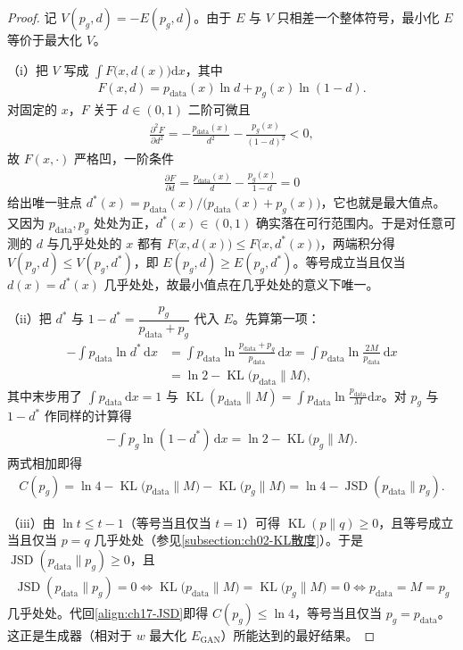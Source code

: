 \documentclass[../../main.tex]{subfiles}
\begin{document}
\begin{proof}
记 $V(p_g,d)=-E(p_g,d)$。由于 $E$ 与 $V$ 只相差一个整体符号，最小化 $E$ 等价于最大化 $V$。

（i）把 $V$ 写成 $\int F\big(x,d(x)\big)\mathrm{d}x$，其中
\begin{align*}
F(x,d)=p_{\mathrm{data}}(x)\ln d+p_g(x)\ln(1-d).
\end{align*}
对固定的 $x$，$F$ 关于 $d\in(0,1)$ 二阶可微且
\begin{align*}
\frac{\partial^2F}{\partial d^2}=-\frac{p_{\mathrm{data}}(x)}{d^2}-\frac{p_g(x)}{(1-d)^2}<0,
\end{align*}
故 $F(x,\cdot)$ 严格凹，一阶条件
\begin{align*}
\frac{\partial F}{\partial d}=\frac{p_{\mathrm{data}}(x)}{d}-\frac{p_g(x)}{1-d}=0
\end{align*}
给出唯一驻点 $d^*(x)=p_{\mathrm{data}}(x)/\big(p_{\mathrm{data}}(x)+p_g(x)\big)$，它也就是最大值点。又因为 $p_{\mathrm{data}},p_g$ 处处为正，$d^*(x)\in(0,1)$ 确实落在可行范围内。于是对任意可测的 $d$ 与几乎处处的 $x$ 都有 $F\big(x,d(x)\big)\leqslant F\big(x,d^*(x)\big)$，两端积分得 $V(p_g,d)\leqslant V(p_g,d^*)$，即 $E(p_g,d)\geqslant E(p_g,d^*)$。等号成立当且仅当 $d(x)=d^*(x)$ 几乎处处，故最小值点在几乎处处的意义下唯一。

（ii）把 $d^*$ 与 $1-d^*=\dfrac{p_g}{p_{\mathrm{data}}+p_g}$ 代入 $E$。先算第一项：
\begin{align*}
-\int p_{\mathrm{data}}\ln d^*\,\mathrm{d}x
&=\int p_{\mathrm{data}}\ln\frac{p_{\mathrm{data}}+p_g}{p_{\mathrm{data}}}\,\mathrm{d}x
=\int p_{\mathrm{data}}\ln\frac{2M}{p_{\mathrm{data}}}\,\mathrm{d}x\\
&=\ln 2-\operatorname{KL}\big(p_{\mathrm{data}}\|M\big),
\end{align*}
其中末步用了 $\int p_{\mathrm{data}}\,\mathrm{d}x=1$ 与 $\operatorname{KL}(p_{\mathrm{data}}\|M)=\int p_{\mathrm{data}}\ln\frac{p_{\mathrm{data}}}{M}\mathrm{d}x$。对 $p_g$ 与 $1-d^*$ 作同样的计算得
\begin{align*}
-\int p_g\ln(1-d^*)\,\mathrm{d}x=\ln 2-\operatorname{KL}\big(p_g\|M\big).
\end{align*}
两式相加即得
\begin{align*}
C(p_g)=\ln 4-\operatorname{KL}\big(p_{\mathrm{data}}\|M\big)-\operatorname{KL}\big(p_g\|M\big)=\ln 4-\operatorname{JSD}(p_{\mathrm{data}}\|p_g).
\end{align*}

（iii）由 $\ln t\leqslant t-1$（等号当且仅当 $t=1$）可得 $\operatorname{KL}(p\|q)\geqslant0$，且等号成立当且仅当 $p=q$ 几乎处处（参见\cref{subsection:ch02-KL散度}）。于是 $\operatorname{JSD}(p_{\mathrm{data}}\|p_g)\geqslant0$，且
\begin{align*}
\operatorname{JSD}(p_{\mathrm{data}}\|p_g)=0
\iff \operatorname{KL}\big(p_{\mathrm{data}}\|M\big)=\operatorname{KL}\big(p_g\|M\big)=0
\iff p_{\mathrm{data}}=M=p_g
\end{align*}
几乎处处。代回\eqref{align:ch17-JSD}即得 $C(p_g)\leqslant\ln 4$，等号当且仅当 $p_g=p_{\mathrm{data}}$。这正是生成器（相对于 $w$ 最大化 $E_{\mathrm{GAN}}$）所能达到的最好结果。
\end{proof}
\end{document}
